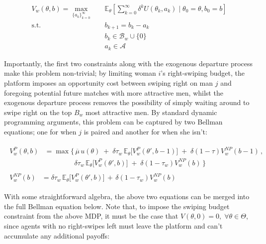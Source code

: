 \begin{equation*}
    \begin{aligned} 
        V_w(\theta,b)=\max_{\{a_k\}^\infty_{k=0}} \quad & \mathbb{E}_{\theta}\left[\sum^\infty_{k=0} \delta^{k} U(\theta_k, a_k) \;|\; \theta_0=\theta, b_0=b\right]\\ 
        \textrm{s.t.} \quad & b_{k+1} = b_k -a_k \\
        & b_k\in \mathcal{B}_w \cup \{0\} \\
        & a_k\in \mathcal{A}  
    \end{aligned}
\end{equation*}

Importantly, the first two constraints along with the exogenous departure process make this problem non-trivial; by limiting woman $i$'s right-swiping budget, the platform imposes an opportunity cost between swiping right on man $j$ and foregoing potential future matches with more attractive men, whilst the exogenous departure process removes the possibility of simply waiting around to swipe right on the top $B_w$ most attractive men. By standard dynamic programming arguments, this problem can be captured by two Bellman equations; one for when $j$ is paired and another for when she isn't:

\begin{align}
    \begin{split} 
        V^{P}_w(\theta,b) &=\max \Big\{ \, \overline{\mu}\, u(\theta) \;+\; \delta \tau_w \,\mathbb{E}_\theta \Big[V^P_w(\theta', b-1)\Big] \;+\; \delta (1-\tau)V^{NP}_w(b-1) \, ,\\[6pt]
        & \quad\quad\quad\quad\;\delta \tau_w \, \mathbb{E}_\theta\Big[ V^P_w(\theta', b) \Big] \;+\; \delta (1-\tau_w) V^{NP}_w(b) \, \Big\}
    \end{split}\\[10pt]
    \begin{split}
        V^{NP}_w(b) &= {}\delta \tau_w \,\mathbb{E}_\theta \Big[ V^P_w(\theta', b)\Big] \,+\, \delta (1-\tau_w) V^{NP}_w(b)
    \end{split} 
\end{align} 

With some straightforward algebra, the above two equations can be merged into the full Bellman equation below. Note that, to impose the swiping budget constraint from the above MDP, it must be the case that $V(\theta, 0)=0, \; \forall \theta \in \Theta$, since agents with no right-swipes left must leave the platform and can't accumulate any additional payoffs:

